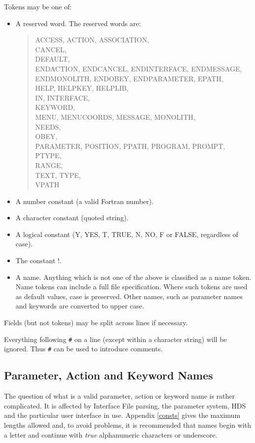 \documentclass[twoside,11pt]{article}
\newcommand{\xlabel}[1]{}
\renewcommand{\_}{\texttt{\symbol{95}}}
\begin{document}
Tokens may be one of:
\begin{itemize}
\item A reserved word. The reserved words are: 
\begin{quote}
ACCESS,  
ACTION,  
ASSOCIATION,\\ 
CANCEL,\\ 
DEFAULT,\\ 
ENDACTION,  
ENDCANCEL,  
ENDINTERFACE,  
ENDMESSAGE,\\  
ENDMONOLITH,  
ENDOBEY,  
ENDPARAMETER,  
EPATH,\\ 
HELP,  
HELPKEY,  
HELPLIB,\\
IN,  
INTERFACE,\\ 
KEYWORD,\\ 
MENU,  
MENUCOORDS,  
MESSAGE,  
MONOLITH,\\ 
NEEDS,\\ 
OBEY,\\ 
PARAMETER,  
POSITION,  
PPATH,  
PROGRAM,  
PROMPT,  
PTYPE,\\ 
RANGE,\\ 
TEXT,  
TYPE,\\ 
VPATH
\end{quote}
\item A number constant (a valid Fortran number).
\item A character constant (quoted string).
\item A logical constant (Y, YES, T, TRUE, N, NO, F or FALSE, regardless of 
case).
\item The constant !.
\item A name. Anything which is not one of the above is classified as a name
token.
Name tokens can include a full file specification. Where such tokens are
used as default values, case is preserved. Other names, such as parameter names
and keywords are converted to upper case.
\end{itemize}
Fields (but not tokens) may be split across lines if necessary.

Everything following \texttt{\#} on a line (except within a character
string) will be ignored.
Thus  \texttt{\#} can be used to introduce comments.

\subsection{Parameter, Action and Keyword Names
\xlabel{parameter_action_and_keyword_names}\label{names}}

The question of what is a valid parameter, action or keyword name is rather
complicated.
It is affected by Interface File parsing, the parameter system, HDS and the
particular user interface in use.
Appendix \ref{consts} gives the maximum lengths allowed and, to avoid problems,
it is recommended that names begin with a letter and continue with {\em true}
alphanumeric characters or underscore.
\end{document}
